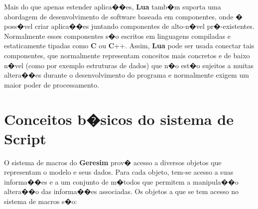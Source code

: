 \documentclass[dissertacao,modelo1,brazil]{ThesisPUC}
\begin{document}
Mais do que apenas estender aplica��es, \textbf{Lua}
tamb�m suporta uma abordagem de desenvolvimento de software 
baseada em componentes, onde � poss�vel criar aplica��es
juntando componentes de alto-n�vel pr�-existentes.
Normalmente esses componentes s�o escritos em linguagens 
compiladas e estaticamente tipadas como \textbf{C} ou \textbf{C}++.
Assim, \textbf{Lua} pode ser usada conectar tais componentes, 
que normalmente representam conceitos mais concretos
e de baixo n�vel (como por exemplo estruturas de dados) que n�o est�o sujeitos a muitas altera��es
durante o desenvolvimento do programa e normalmente exigem um maior poder de processamento.
\cite{Ieru03}




\section{Conceitos b�sicos do sistema de Script}

O sistema de macros do \textbf{Geresim} prov� acesso a diversos objetos que 
representam o modelo e seus dados. Para cada objeto, tem-se acesso a suas 
informa��es e a um conjunto de m�todos que permitem a 
manipula��o altera��o das informa��es associadas. Os objetos a que se tem 
acesso no sistema de macros s�o: 
\end{document}
